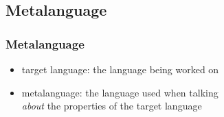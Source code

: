 \documentclass[dvipsnames]{beamer}
\begin{document}
%
%
%
%
%

\subsection{Metalanguage}

\begin{frame}
  \frametitle{Metalanguage}

  \begin{itemize}
    \item \alert{target language}: the language being worked on

    \pause
    \medskip
    \item \alert{metalanguage}: the language used when talking\\
      \emph{about} the properties of the target language
  \end{itemize}
\end{frame}
\end{document}
